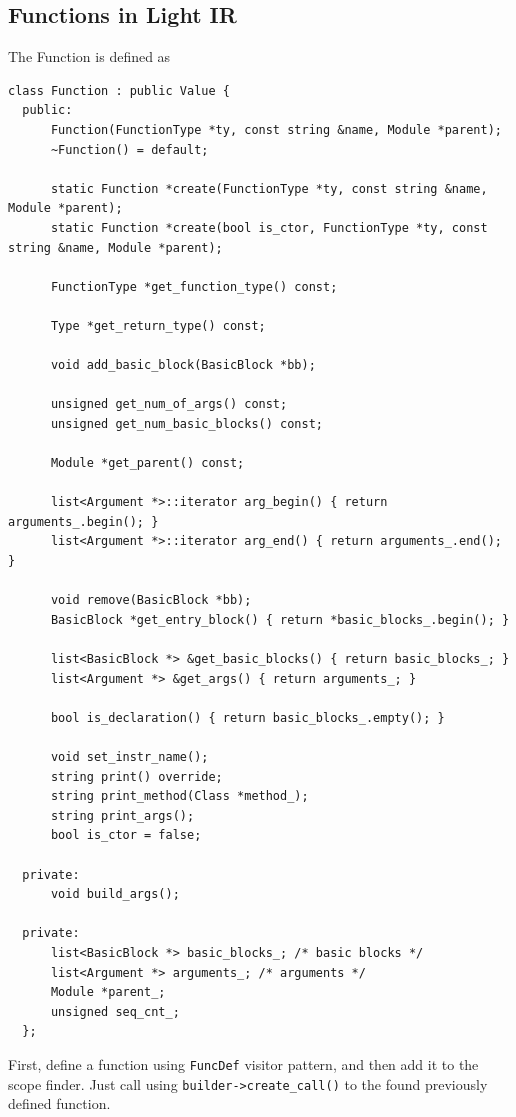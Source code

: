 \documentclass[a4paper]{exam}
\theoremstyle{definition}
\begin{document}
\subsection{Functions in Light IR}
The Function is defined as
\begin{verbatim}
class Function : public Value {
  public:
      Function(FunctionType *ty, const string &name, Module *parent);
      ~Function() = default;
  
      static Function *create(FunctionType *ty, const string &name, Module *parent);
      static Function *create(bool is_ctor, FunctionType *ty, const string &name, Module *parent);
  
      FunctionType *get_function_type() const;
  
      Type *get_return_type() const;
  
      void add_basic_block(BasicBlock *bb);
  
      unsigned get_num_of_args() const;
      unsigned get_num_basic_blocks() const;
  
      Module *get_parent() const;
  
      list<Argument *>::iterator arg_begin() { return arguments_.begin(); }
      list<Argument *>::iterator arg_end() { return arguments_.end(); }
  
      void remove(BasicBlock *bb);
      BasicBlock *get_entry_block() { return *basic_blocks_.begin(); }
  
      list<BasicBlock *> &get_basic_blocks() { return basic_blocks_; }
      list<Argument *> &get_args() { return arguments_; }
  
      bool is_declaration() { return basic_blocks_.empty(); }
  
      void set_instr_name();
      string print() override;
      string print_method(Class *method_);
      string print_args();
      bool is_ctor = false;
  
  private:
      void build_args();
  
  private:
      list<BasicBlock *> basic_blocks_; /* basic blocks */
      list<Argument *> arguments_; /* arguments */
      Module *parent_;
      unsigned seq_cnt_;
  };
\end{verbatim}
First, define a function using \texttt{FuncDef} visitor pattern, and then add it to the scope finder. Just call using \texttt{builder->create\_call()} to the found previously defined function.
\end{document}
